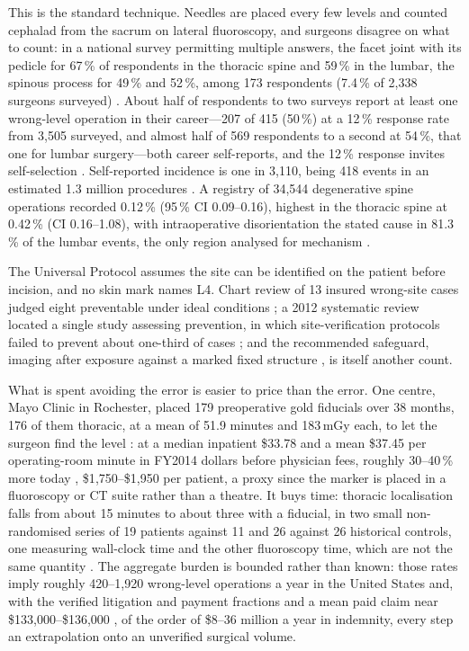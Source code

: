 \documentclass[11pt,letterpaper]{article}
\begin{document}
This is the standard technique. Needles are placed every few levels and counted cephalad from the sacrum on
lateral fluoroscopy, and surgeons disagree on what to count: in a national survey permitting multiple
answers, the facet joint with its pedicle for 67\,\% of respondents in the thoracic spine and 59\,\% in the
lumbar, the spinous process for 49\,\% and 52\,\%, among 173 respondents (7.4\,\% of 2{,}338 surgeons
surveyed) \citep{strong2021,mayer2008}. About half of respondents to two surveys report at least one wrong-level
operation in their career---207 of 415 (50\,\%) at a 12\,\% response rate from 3{,}505 surveyed, and almost
half of 569 respondents to a second at 54\,\%, that one for lumbar surgery---both career self-reports, and
the 12\,\% response invites self-selection \citep{mody2008,groff2013}. Self-reported incidence is one in
3{,}110, being 418 events in an estimated 1.3 million procedures \citep{mody2008}. A registry of 34{,}544
degenerative spine operations recorded 0.12\,\% (95\,\% CI 0.09--0.16), highest in the thoracic spine at
0.42\,\% (CI 0.16--1.08), with intraoperative disorientation the stated cause in 81.3\,\% of the lumbar
events, the only region analysed for mechanism \citep{furuya2026}.

The Universal Protocol assumes the site can be identified on the patient before incision, and no skin mark
names L4. Chart review of 13 insured wrong-site cases judged eight preventable under ideal conditions
\citep{kwaan2006}; a 2012 systematic review located a single study assessing prevention, in which
site-verification protocols failed to prevent about one-third of cases \citep{longo2012}; and the
recommended safeguard, imaging after exposure against a marked fixed structure \citep{devine2010}, is
itself another count.

What is spent avoiding the error is easier to price than the error. One centre, Mayo Clinic in Rochester,
placed 179 preoperative gold fiducials over 38 months, 176 of them thoracic, at a mean of 51.9 minutes and
183\,mGy each, to let the surgeon find the level \citep{siminski2023}: at a median inpatient \$33.78 and a mean \$37.45 per
operating-room minute in FY2014 dollars before physician fees, roughly 30--40\,\% more today
\citep{childers2018}, \$1{,}750--\$1{,}950 per patient, a proxy since the marker is placed in a fluoroscopy
or CT suite rather than a theatre. It buys time: thoracic localisation falls from about 15 minutes to about
three with a fiducial, in two small non-randomised series of 19 patients against 11 and 26 against 26
historical controls, one measuring wall-clock time and the other fluoroscopy time, which are not the same
quantity \citep{mongardi2021,upadhyaya2012}. The aggregate burden is bounded rather than known: those rates
imply roughly 420--1{,}920 wrong-level operations a year in the United States and, with the verified
litigation and payment fractions \citep{mody2008,goodkin2004} and a mean paid claim near
\$133{,}000--\$136{,}000 \citep{mehtsun2013,tan2023}, of the order of \$8--36 million a year in indemnity,
every step an extrapolation onto an unverified surgical volume.
\end{document}
